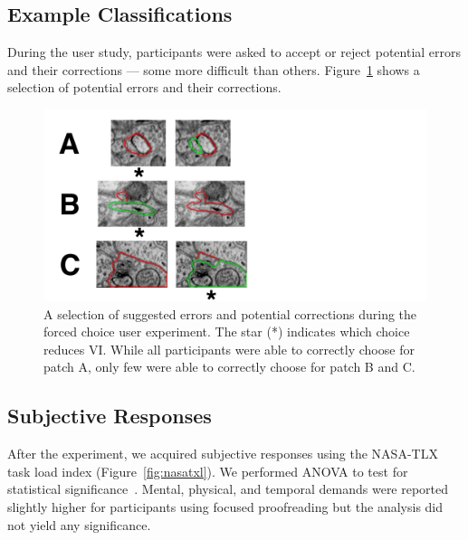 \subsection{Example Classifications}

During the user study, participants were asked to accept or reject potential errors and their corrections --- some more difficult than others. Figure~\ref{fig:patches} shows a selection of potential errors and their corrections.

\begin{figure}[t]
\centering
\includegraphics[width=\linewidth]{gfx/patches.pdf}
\caption{A selection of suggested errors and potential corrections during the forced choice user experiment. The star (*) indicates which choice reduces VI. While all participants were able to correctly choose for patch A, only few were able to correctly choose for patch B and C.}
\label{fig:patches}
\end{figure}

\subsection{Subjective Responses}

After the experiment, we acquired subjective responses using the NASA-TLX task load index (Figure~\ref{fig:nasatxl}). We performed ANOVA to test for statistical significance~\cite{shaffer1995}. Mental, physical, and temporal demands were reported slightly higher for participants using focused proofreading but the analysis did not yield any significance. 


